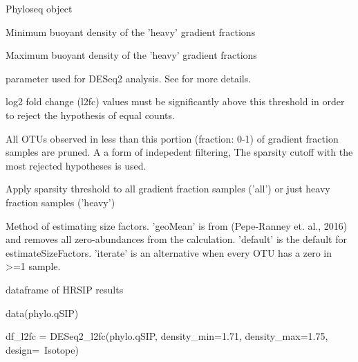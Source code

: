 \documentclass[a4paper]{book}
\begin{document}
\begin{Arguments}
\begin{ldescription}
\item[\code{physeq}] Phyloseq object

\item[\code{density\_min}] Minimum buoyant density of the 'heavy' gradient fractions

\item[\code{density\_max}] Maximum buoyant density of the 'heavy' gradient fractions

\item[\code{design}]  parameter used for DESeq2 analysis.
See  for more details.

\item[\code{l2fc\_threshold}] log2 fold change (l2fc) values must be significantly above this
threshold in order to reject the hypothesis of equal counts.

\item[\code{sparsity\_threshold}] All OTUs observed in less than this portion (fraction: 0-1)
of gradient fraction samples are pruned. A a form of indepedent filtering,
The sparsity cutoff with the most rejected hypotheses is used.

\item[\code{sparsity\_apply}] Apply sparsity threshold to all gradient fraction samples ('all')
or just heavy fraction samples ('heavy')

\item[\code{size\_factors}] Method of estimating size factors.
'geoMean' is from (Pepe-Ranney et. al., 2016) and removes all zero-abundances from the calculation.
'default' is the default for estimateSizeFactors.
'iterate' is an alternative when every OTU has a zero in >=1 sample.
\end{ldescription}
\end{Arguments}
%
\begin{Value}
dataframe of HRSIP results
\end{Value}
%
\begin{Examples}
\begin{ExampleCode}
data(phylo.qSIP)


df_l2fc = DESeq2_l2fc(phylo.qSIP, density_min=1.71, density_max=1.75, design=~Isotope)


\end{ExampleCode}
\end{Examples}
\end{document}
